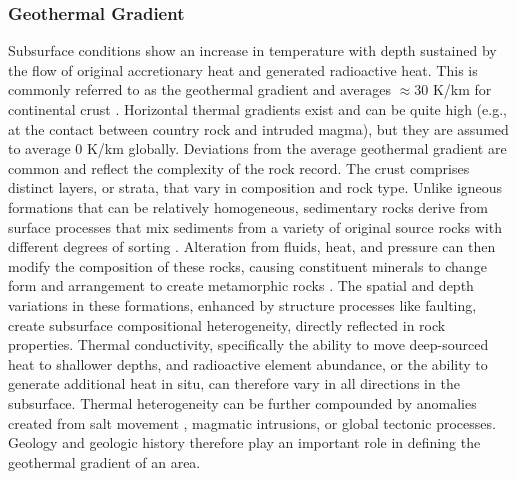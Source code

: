 \subsubsection{Geothermal Gradient}\label{ch2:geotherm}
Subsurface conditions show an increase in temperature with depth sustained by the flow of original accretionary heat and generated radioactive heat. This is commonly referred to as the geothermal gradient and averages $\approx30$ K/km for continental crust \citep[p.\ 209]{press_understanding_2004}. Horizontal thermal gradients exist and can be quite high (e.g., at the contact between country rock and intruded magma), but they are assumed to average 0 K/km globally. Deviations from the average geothermal gradient are common and reflect the complexity of the rock record. The crust comprises distinct layers, or strata, that vary in composition and rock type. Unlike igneous formations that can be relatively homogeneous, sedimentary rocks derive from surface processes that mix sediments from a variety of original source rocks with different degrees of sorting \citep[p.\ 164--168]{press_understanding_2004}. Alteration from fluids, heat, and pressure can then modify the composition of these rocks, causing constituent minerals to change form and arrangement to create metamorphic rocks \citep[p.\ 195--205]{press_understanding_2004}. The spatial and depth variations in these formations, enhanced by structure processes like faulting, create subsurface compositional heterogeneity, directly reflected in rock properties. Thermal conductivity, specifically the ability to move deep-sourced heat to shallower depths, and radioactive element abundance, or the ability to generate additional heat in situ, can therefore vary in all directions in the subsurface. Thermal heterogeneity can be further compounded by anomalies created from salt movement \citep[p.\ 164--168]{press_understanding_2004}, magmatic intrusions, or global tectonic processes. Geology and geologic history therefore play an important role in defining the geothermal gradient of an area.

